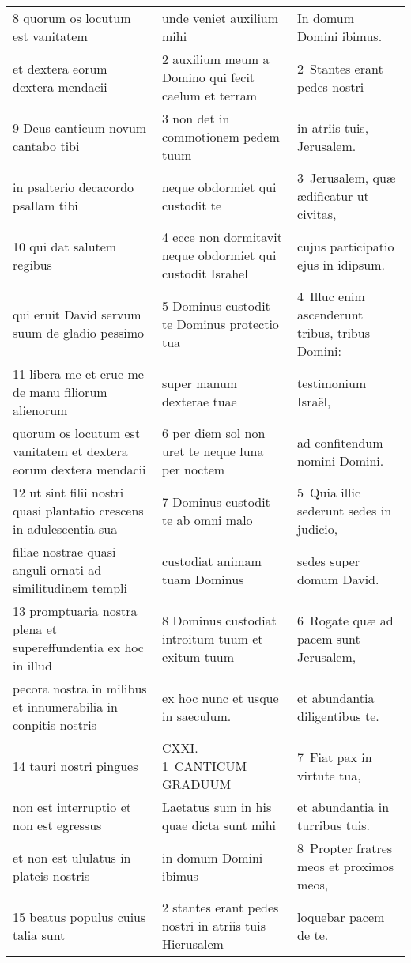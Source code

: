 \documentclass{article}
\begin{document}
\begin{longtable}{@{}p{}p{}p{}@{}}
8 quorum os locutum est vanitatem	&	unde veniet auxilium mihi	&	In domum Domini ibimus.	\\
et dextera eorum dextera mendacii	&	2 auxilium meum a Domino qui fecit caelum et terram	&	2 Stantes erant pedes nostri	\\
9 Deus canticum novum cantabo tibi	&	3 non det in commotionem pedem tuum	&	in atriis tuis, Jerusalem.	\\
in psalterio decacordo psallam tibi	&	neque obdormiet qui custodit te	&	3 Jerusalem, quæ ædificatur ut civitas,	\\
10 qui dat salutem regibus	&	4 ecce non dormitavit neque obdormiet qui custodit Israhel	&	cujus participatio ejus in idipsum.	\\
qui eruit David servum suum de gladio pessimo	&	5 Dominus custodit te Dominus protectio tua	&	4 Illuc enim ascenderunt tribus, tribus Domini:	\\
11 libera me et erue me de manu filiorum alienorum	&	super manum dexterae tuae	&	testimonium Israël,	\\
quorum os locutum est vanitatem et dextera eorum dextera mendacii	&	6 per diem sol non uret te neque luna per noctem	&	ad confitendum nomini Domini.	\\
12 ut sint filii nostri quasi plantatio crescens in adulescentia sua	&	7 Dominus custodit te ab omni malo	&	5 Quia illic sederunt sedes in judicio,	\\
filiae nostrae quasi anguli ornati ad similitudinem templi	&	custodiat animam tuam Dominus	&	sedes super domum David.	\\
13 promptuaria nostra plena et supereffundentia ex hoc in illud	&	8 Dominus custodiat introitum tuum et exitum tuum	&	6 Rogate quæ ad pacem sunt Jerusalem,	\\
pecora nostra in milibus et innumerabilia in conpitis nostris	&	ex hoc nunc et usque in saeculum.	&	et abundantia diligentibus te.	\\
14 tauri nostri pingues	&	CXXI. 1 CANTICUM GRADUUM	&	7 Fiat pax in virtute tua,	\\
non est interruptio et non est egressus	&	Laetatus sum in his quae dicta sunt mihi	&	et abundantia in turribus tuis.	\\
et non est ululatus in plateis nostris	&	in domum Domini ibimus	&	8 Propter fratres meos et proximos meos,	\\
15 beatus populus cuius talia sunt	&	2 stantes erant pedes nostri in atriis tuis Hierusalem	&	loquebar pacem de te.	\\

\end{longtable}
\end{document}
